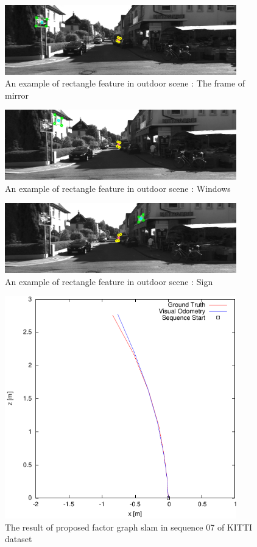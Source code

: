 \documentclass[master,korean,final]{cbnu-ecs}
\begin{document}
\begin{figure}[!ht]
  \centering
	\includegraphics[width=380px]{img/feature_kitti_01.png}
  \caption{An example of rectangle feature in outdoor scene : The frame of mirror }
\label{feature_kitti_01}
\end{figure}

\begin{figure}[!ht]
  \centering
	\includegraphics[width=380px]{img/feature_kitti_02.png}
  \caption{An example of rectangle feature in outdoor scene : Windows }
\label{feature_kitti_02}
\end{figure}

\begin{figure}[!ht]
  \centering
	\includegraphics[width=380px]{img/feature_kitti_03.png}
  \caption{An example of rectangle feature in outdoor scene : Sign }
\label{feature_kitti_03}
\end{figure}

\clearpage
\begin{figure}[!ht]
  \centering
	\includegraphics[width=380px]{img/seq_07.pdf}
  \caption{The result of proposed factor graph slam in sequence 07 of KITTI dataset}
\label{seq_07}
\end{figure}
\end{document}
